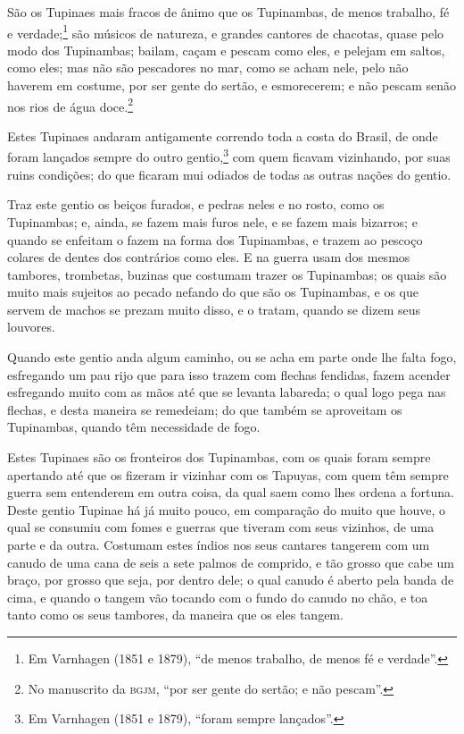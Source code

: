 \begin{linenumbers}
São os Tupinaes mais fracos de ânimo que os Tupinambas, de menos trabalho, fé e
verdade;\footnote{ Em Varnhagen (1851 e 1879), ``de menos trabalho, de menos fé e
verdade''.} são músicos de natureza, e grandes cantores de chacotas, quase pelo modo dos
Tupinambas; bailam, caçam e pescam como eles, e pelejam em saltos, como eles; mas não são
pescadores no mar, como se acham nele, pelo não haverem em costume, por ser gente do
sertão, e esmorecerem; e não pescam senão nos rios de água doce.\footnote{ No manuscrito
da \textsc{bgjm}, ``por ser gente do sertão; e não pescam''.}

Estes Tupinaes andaram antigamente correndo toda a costa do Brasil, de onde foram lançados
sempre do outro gentio,\footnote{ Em Varnhagen (1851 e 1879), ``foram sempre lançados''.}
com quem ficavam vizinhando, por suas ruins condições; do que ficaram mui odiados de todas
as outras nações do gentio.

Traz este gentio os beiços furados, e pedras neles e no rosto, como os Tupinambas; e,
ainda, se fazem mais furos nele, e se fazem mais bizarros; e quando se enfeitam o fazem na
forma dos Tupinambas, e trazem ao pescoço colares de dentes dos contrários como eles. E na
guerra usam dos mesmos tambores, trombetas, buzinas que costumam trazer os Tupinambas; os
quais são muito mais sujeitos ao pecado nefando do que são os Tupinambas, e os que servem
de machos se prezam muito disso, e o tratam, quando se dizem seus louvores.

Quando este gentio anda algum caminho, ou se acha em parte onde lhe falta fogo, esfregando
um pau rijo que para isso trazem com flechas fendidas, fazem acender esfregando muito com
as mãos até que se levanta labareda; o qual logo pega nas flechas, e desta maneira se
remedeiam; do que também se aproveitam os Tupinambas, quando têm necessidade de fogo.

Estes Tupinaes são os fronteiros dos Tupinambas, com os quais foram sempre apertando até
que os fizeram ir vizinhar com os Tapuyas, com quem têm sempre guerra sem entenderem em
outra coisa, da qual saem como lhes ordena a fortuna. Deste gentio Tupinae há já muito
pouco, em comparação do muito que houve, o qual se consumiu com fomes e guerras que
tiveram com seus vizinhos, de uma parte e da outra. Costumam estes índios nos seus
cantares tangerem com um canudo de uma cana de seis a sete palmos de comprido, e tão
grosso que cabe um braço, por grosso que seja, por dentro dele; o qual canudo é aberto
pela banda de cima, e quando o tangem vão tocando com o fundo do canudo no chão, e toa
tanto como os seus tambores, da maneira que os eles tangem.


\end{linenumbers}
